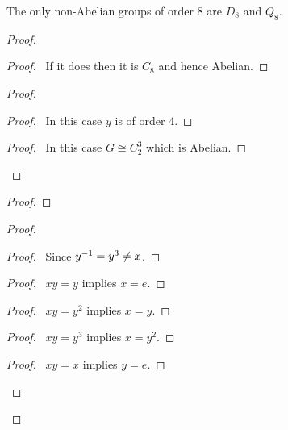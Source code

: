 \begin{prop}
\label{prop:order-eight}
The only non-Abelian groups of order 8 are $D_8$ and $Q_8$.
\end{prop}

\begin{proof}
\pf
{}
\begin{proof}
	\pf\ If it does then it is $C_8$ and hence Abelian.
\end{proof}
\begin{proof}
	\begin{proof}
		\pf\ In this case $y$ is of order 4.
	\end{proof}
	\begin{proof}
		\pf\ In this case $G \cong C_2^3$ which is Abelian.
	\end{proof}
\end{proof}
\begin{proof}
\end{proof}
\begin{proof}
	\begin{proof}
		\pf\ Since ${y}^{-1} = y^3 \neq x$.
	\end{proof}
	\begin{proof}
		\pf\ $xy = y$ implies $x=e$.
	\end{proof}
	\begin{proof}
		\pf\ $xy = y^2$ implies $x = y$.
	\end{proof}
	\begin{proof}
		\pf\ $xy = y^3$ implies $x = y^2$.
	\end{proof}
	\begin{proof}
		\pf\ $xy = x$ implies $y = e$.
	\end{proof}

\end{proof}
\end{proof}
